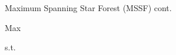\begin{frame}{Maximum Spanning Star Forest (MSSF) cont.}
\begin{center}
\Huge
Max {\color{green} \faLeaf\faLeaf\faLeaf} 

s.t.

\end{center}
\end{frame}
